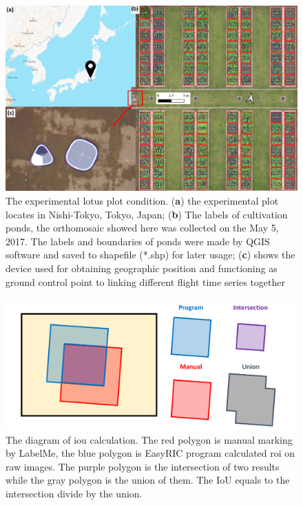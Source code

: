 \documentclass{configs/bmcart}
\begin{document}
\begin{backmatter}
\begin{figure}[!htb]
  \includegraphics[width=0.95\linewidth]{figures/map.pdf}
  \caption{The experimental lotus plot condition. (\textbf{a}) the experimental plot locates in Nishi-Tokyo, Tokyo, Japan; (\textbf{b}) The labels of cultivation ponds, the orthomosaic showed here was collected on the May 5, 2017. The labels and boundaries of ponds were made by QGIS software and saved to shapefile (*.shp) for later usage; (\textbf{c}) shows the device used for obtaining geographic position and functioning as ground control point to linking different flight time series together}
  \label{fig:map}
\end{figure}

\begin{figure}[!htb]
  \includegraphics[width=0.95\linewidth]{figures/iou.pdf}
  \caption{The diagram of \acrfull*{iou} calculation. The red polygon is manual marking by LabelMe, the blue polygon is EasyRIC program calculated \acrfull*{roi} on raw images. The purple polygon is the intersection of two results while the gray polygon is the union of them. The IoU equals to the intersection divide by the union.}
  \label{fig:iou}
\end{figure}


\end{backmatter}
\end{document}
